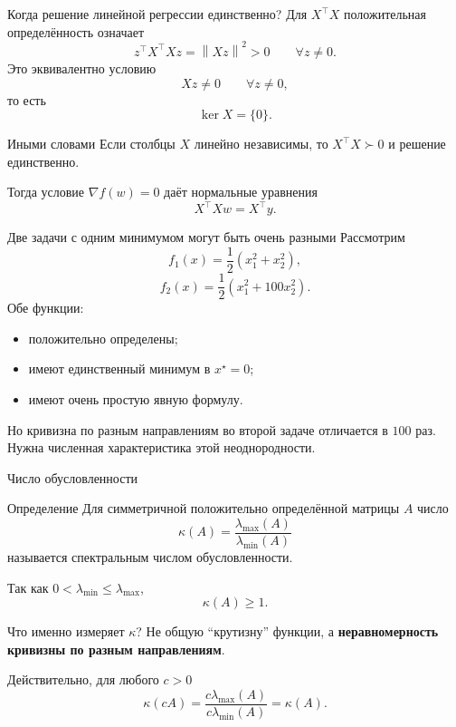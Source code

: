 \documentclass[aspectratio=169,10pt]{beamer}
\newcommand{\norm}[1]{\left\lVert #1\right\rVert}
\newcommand{\grad}{\nabla}
\newcommand{\lammin}{\lambda_{\min}}
\newcommand{\lammax}{\lambda_{\max}}
\begin{document}
\begin{frame}{Когда решение линейной регрессии единственно?}
\small
Для $X^\top X$ положительная определённость означает
\[
 z^\top X^\top Xz=\norm{Xz}^2>0
 \qquad\forall z\ne0.
\]
Это эквивалентно условию
\[
 Xz\ne0\qquad\forall z\ne0,
\]
то есть
\[
 \ker X=\{0\}.
\]

\begin{alertblock}{Иными словами}
Если столбцы $X$ линейно независимы, то $X^\top X\succ0$ и решение единственно.
\end{alertblock}

Тогда условие $\grad f(w)=0$ даёт нормальные уравнения
\[
 X^\top Xw=X^\top y.
\]
\end{frame}

\begin{frame}{Две задачи с одним минимумом могут быть очень разными}
\small
Рассмотрим
\[
 f_1(x)=\frac12(x_1^2+x_2^2),
\]
\[
 f_2(x)=\frac12(x_1^2+100x_2^2).
\]
Обе функции:
\begin{itemize}
 \item положительно определены;
 \item имеют единственный минимум в $x^\star=0$;
 \item имеют очень простую явную формулу.
\end{itemize}

Но кривизна по разным направлениям во второй задаче отличается в $100$ раз. Нужна численная характеристика этой неоднородности.
\end{frame}

\begin{frame}{Число обусловленности}
\small
\begin{block}{Определение}
Для симметричной положительно определённой матрицы $A$ число
\[
 \boxed{
 \kappa(A)=\frac{\lammax(A)}{\lammin(A)}
 }
\]
называется спектральным числом обусловленности.
\end{block}

Так как $0<\lammin\le\lammax$,
\[
 \kappa(A)\ge1.
\]

\begin{alertblock}{Что именно измеряет $\kappa$?}
Не общую ``крутизну'' функции, а \textbf{неравномерность кривизны по разным направлениям}.
\end{alertblock}

Действительно, для любого $c>0$
\[
 \kappa(cA)=\frac{c\lammax(A)}{c\lammin(A)}=\kappa(A).
\]
\end{frame}
\end{document}
